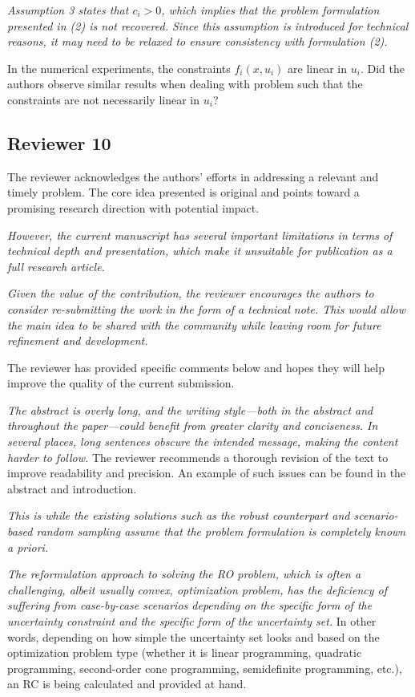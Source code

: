 \documentclass[journal,twoside,web]{ieeecolor}
\begin{document}
\textcolor{reviewerred}{\textit{Assumption 3 states that $c_i > 0$, which implies that the problem formulation presented in (2) is not recovered. Since this assumption is introduced for technical reasons, it may need to be relaxed to ensure consistency with formulation (2).}}

In the numerical experiments, the constraints $f_i(x, u_i)$ are linear in $u_i$. Did the authors observe similar results when dealing with problem such that the constraints are not necessarily linear in $u_i$?

\subsection*{Reviewer 10}

The reviewer acknowledges the authors' efforts in addressing a relevant and timely problem. The core idea presented is original and points toward a promising research direction with potential impact.

\textcolor{reviewerred}{\textit{However, the current manuscript has several important limitations in terms of technical depth and presentation, which make it unsuitable for publication as a full research article.}}

\textcolor{reviewerred}{\textit{Given the value of the contribution, the reviewer encourages the authors to consider re-submitting the work in the form of a technical note. This would allow the main idea to be shared with the community while leaving room for future refinement and development.}}

The reviewer has provided specific comments below and hopes they will help improve the quality of the current submission.

\textcolor{reviewerred}{\textit{The abstract is overly long, and the writing style—both in the abstract and throughout the paper—could benefit from greater clarity and conciseness. In several places, long sentences obscure the intended message, making the content harder to follow.}} The reviewer recommends a thorough revision of the text to improve readability and precision. An example of such issues can be found in the abstract and introduction.

\textcolor{reviewerred}{\textit{This is while the existing solutions such as the robust counterpart and scenario-based random sampling assume that the problem formulation is completely known a priori.}}

\textcolor{reviewerred}{\textit{The reformulation approach to solving the RO problem, which is often a challenging, albeit usually convex, optimization problem, has the deficiency of suffering from case-by-case scenarios depending on the specific form of the uncertainty constraint and the specific form of the uncertainty set.}} In other words, depending on how simple the uncertainty set looks and based on the optimization problem type (whether it is linear programming, quadratic programming, second-order cone programming, semidefinite programming, etc.), an RC is being calculated and provided at hand.
\end{document}
